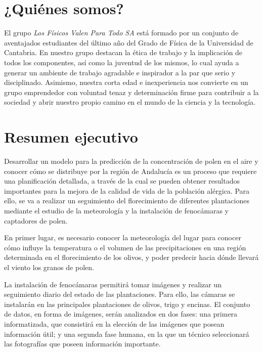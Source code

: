 \documentclass[12pt,oneside,a4paper]{article}
\makeatletter
\numberwithin{figure}{section}
\def\cleardoublepage{\clearpage\if@twoside \ifodd\c@page\else%
\hbox{}%
\thispagestyle{empty}%
\clearpage%
\if@twocolumn\hbox{}\clearpage\fi\fi\fi}
\makeatother
\begin{document}
\section*{¿Quiénes somos?}

El grupo \textit{Los Físicos Valen Para Todo SA} está formado por un conjunto de aventajados estudiantes del último año del Grado de Física de la Universidad de Cantabria. En nuestro grupo destacan la ética de trabajo y la implicación de todos los componentes, así como la juventud de los mismos, lo cual ayuda a generar un ambiente de trabajo agradable e inspirador a la par que serio y disciplinado. Asimismo, nuestra corta edad e inexperiencia nos convierte en un grupo emprendedor con voluntad tenaz y determinación firme para contribuir a la sociedad y abrir nuestro propio camino en el mundo de la ciencia y la tecnología.

\vspace*{\fill}
\cleardoublepage

\section*{Resumen ejecutivo}

Desarrollar un modelo para la predicción de la concentración de polen en el aire y conocer cómo se distribuye por la región de Andalucía es un proceso que requiere una planificación detallada, a través de la cual se pueden obtener resultados importantes para la mejora de la calidad de vida de la población alérgica. Para ello, se va a realizar un seguimiento del florecimiento de diferentes plantaciones mediante el estudio de la meteorología y la instalación de fenocámaras y captadores de polen.

En primer lugar, es necesario conocer la meteorología del lugar para conocer cómo influye la temperatura o el volumen de las precipitaciones en una región determinada en el florecimiento de los olivos, y poder predecir hacia dónde llevará el viento los granos de polen.  

La instalación de fenocámaras permitirá tomar imágenes y realizar un seguimiento diario del estado de las plantaciones. Para ello, las cámaras se instalarán en las principales plantaciones de olivos, trigo y encinas. El conjunto de datos, en forma de imágenes, serán analizados en dos fases: una primera informatizada, que consistirá en la elección de las imágenes que posean información útil; y una segunda fase humana, en la que un técnico seleccionará las fotografías que poseen información importante.
\end{document}
